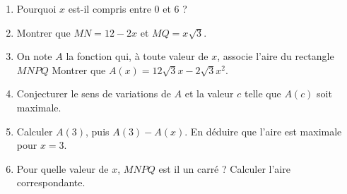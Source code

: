 \begin{enumerate}
\item Pourquoi $x$ est-il compris entre 0 et 6 ?
\item Montrer que $MN = 12 -2x$ et $MQ = x\sqrt{3}$.
\item On note $A$ la fonction qui, à toute valeur de $x$, associe l'aire du rectangle $MNPQ$ Montrer que $A(x)= 12\sqrt{3}x - 2\sqrt{3}x^2$.
\item Conjecturer le sens de variations de $A$ et la valeur $c$ telle que $A(c)$ soit maximale.
\item Calculer $A(3)$, puis $A(3)-A(x)$. En déduire que l'aire est maximale pour $x=3$.
\item Pour quelle valeur de $x$, $MNPQ$ est il un carré ? Calculer l'aire correspondante.
\end{enumerate}